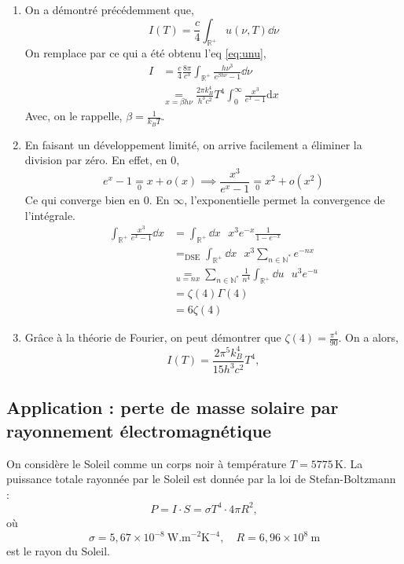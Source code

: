 \documentclass[a4paper,10pt]{report}
\begin{document}
	\begin{enumerate}
	\item On a démontré précédemment que, $$I(T) = \frac c 4\int_{\mathbb{R}^+} u(\nu, T)\dd\nu$$
	On remplace par ce qui a été obtenu l'eq \ref {eq:unu},
	\begin{align*}
		I &= \frac c 4\frac{8\pi}{c^3}\int_{\mathbb{R}^+}\frac{h\nu^3}{e^{\beta h \nu}-1}\dd \nu\\
		&\underset{x = \beta h \nu}{=} \frac{2\pi k_B^4}{h^3c^2}T^4\int_0^\infty \frac {x^3}{e^x-1}\text{d}x
	\end{align*}
Avec, on le rappelle, $\beta = \frac 1 {k_B T}$.
	\item En faisant un développement limité, on arrive facilement a éliminer la division par zéro. En effet, en $0$, 
	$$e^x-1 \underset{0}{=} x + o(x) \implies \frac{x^3}{e^x-1} \underset{0}{=} x^2 +o(x^2)$$
	Ce qui converge bien en $0$.
	En $\infty$, l'exponentielle permet la convergence de l'intégrale.
	\begin{align*}
		\int_{\mathbb{R}^+} \frac{x^3}{e^x-1}\dd x &= \int_{\mathbb{R}^+} \dd x \text{ }x^3 e^{-x}\frac{1}{1-e^{-x}}\\
		&=_{\text{DSE}} \int_{\mathbb{R}^+} \dd x \text{ } x^3 \sum_{n\in \mathbb{N}^*} e^{-nx}\\
		&\underset{u = nx}{=}\sum_{n\in \mathbb{N}^*} \frac 1 {n^4} \int_{\mathbb{R}^+} \dd u \text{ } u^3 e^{-u}\\
		&= \zeta(4)\Gamma(4)\\
	&= 6 \zeta(4)
	\end{align*}
	\item Grâce à la théorie de Fourier, on peut démontrer que $\zeta(4) = \frac{\pi^4}{90}$.
	On a alors,
	\begin{equation*}
		I(T) = \frac{2\pi^5 k_B^4}{15h^3c^2} T^4, \label{eq:I(T)} \tag{4.6.3}
	\end{equation*}
	\end{enumerate}
	\subsection{Application : perte de masse solaire par rayonnement électromagnétique}
On considère le Soleil comme un corps noir à température $T = 5775\,\text{K}$.  
La puissance totale rayonnée par le Soleil est donnée par la loi de Stefan-Boltzmann :
\[
P = I \cdot S = \sigma T^4 \cdot 4 \pi R^2,
\]
où 
\[
\sigma = 5{,}67 \times 10^{-8}\ \text{W.m}^{-2}\text{K}^{-4}, \quad R = 6{,}96 \times 10^{8}\ \text{m}
\]
est le rayon du Soleil.
\end{document}
